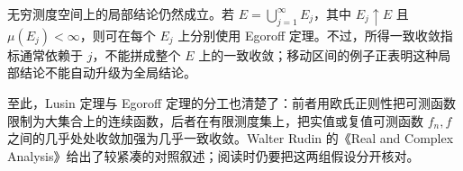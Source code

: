 \ProseParagraphBreak

无穷测度空间上的局部结论仍然成立。若
\(E=\bigcup_{j=1}^{\infty}E_j\)，其中 \(E_j\uparrow E\) 且
\(\mu(E_j)<\infty\)，则可在每个 \(E_j\) 上分别使用 Egoroff 定理。不过，所得一致收敛指标通常依赖于 \(j\)，不能拼成整个 \(E\) 上的一致收敛；移动区间的例子正表明这种局部结论不能自动升级为全局结论。

\ProseParagraphBreak

至此，Lusin 定理与 Egoroff 定理的分工也清楚了：前者用欧氏正则性把可测函数限制为大集合上的连续函数，后者在有限测度集上，把实值或复值可测函数 \(f_n,f\) 之间的几乎处处收敛加强为几乎一致收敛。Walter Rudin 的《Real and Complex Analysis》\cite{Rudin1987Real}给出了较紧凑的对照叙述；阅读时仍要把这两组假设分开核对。

